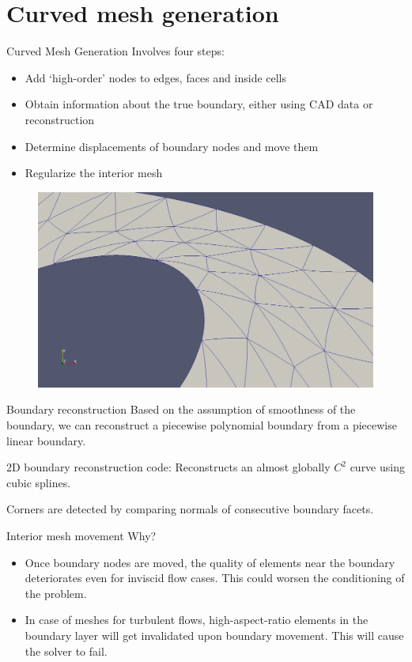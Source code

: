 \documentclass[t,12pt]{beamer}
\begin{document}
\section{Curved mesh generation}

\begin{frame}{Curved Mesh Generation}
Involves four steps:
\begin{itemize}
	\item Add `high-order' nodes to edges, faces and inside cells
	\item Obtain information about the true boundary, either using CAD data or reconstruction
	\item Determine displacements of boundary nodes and move them
	\item Regularize the interior mesh
\end{itemize}
\begin{figure}
	\includegraphics[scale=0.1]{coarse-curved-mesh-zoomed1}
\end{figure}
\end{frame}

\begin{frame}{Boundary reconstruction}
Based on the assumption of smoothness of the boundary, we can reconstruct a piecewise polynomial boundary from a piecewise linear boundary.
\vspace{0.5in}

2D boundary reconstruction code: Reconstructs an almost globally $C^2$ curve using cubic splines.

Corners are detected by comparing normals of consecutive boundary facets.
\end{frame}

\begin{frame}{Interior mesh movement}
Why?
\begin{itemize}
	\item Once boundary nodes are moved, the quality of elements near the boundary deteriorates even for inviscid flow cases. This could worsen the conditioning of the problem.
	\item In case of meshes for turbulent flows, high-aspect-ratio elements in the boundary layer will get invalidated upon boundary movement. This will cause the solver to fail.
\end{itemize}
\end{frame}
\end{document}
